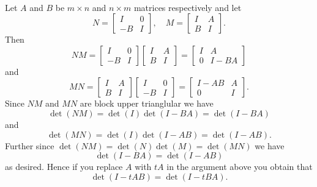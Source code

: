 \documentclass[letterpaper,12pt,oneside,onecolumn]{article}
\newcommand{\1}{\mathbbm{1}}
\begin{document}
\paragraph{}
Let $A$ and $B$ be $m \times n$ and $n \times m$ matrices respectively and let 
$$N = \begin{bmatrix} I & 0 \\-B & I \end{bmatrix}, \quad M = \begin{bmatrix} I & A \\B & I \end{bmatrix}.$$
Then 
$$NM = \begin{bmatrix} I & 0 \\-B & I \end{bmatrix}\begin{bmatrix} I & A \\B & I \end{bmatrix} = \begin{bmatrix}I & A \\ 0 & I-BA\end{bmatrix}$$
and
$$MN = \begin{bmatrix} I & A \\B & I \end{bmatrix}\begin{bmatrix} I & 0 \\-B & I \end{bmatrix} = \begin{bmatrix} I-AB & A \\ 0 & I\end{bmatrix}.$$
Since $NM$ and $MN$ are block upper trianglular we have
$$\det(NM) = \det(I)\det(I-BA) = \det(I-BA)$$
and
$$\det(MN) = \det(I)\det(I-AB) = \det(I-AB).$$
Further since $\det(NM) = \det(N)\det(M) = \det(MN)$ we have
$$\det(I-BA) = \det(I-AB)$$
as desired. Hence if you replace $A$ with $tA$ in the argument above you obtain that
$$\det(I-tAB) = \det(I-tBA).$$
\end{document}
